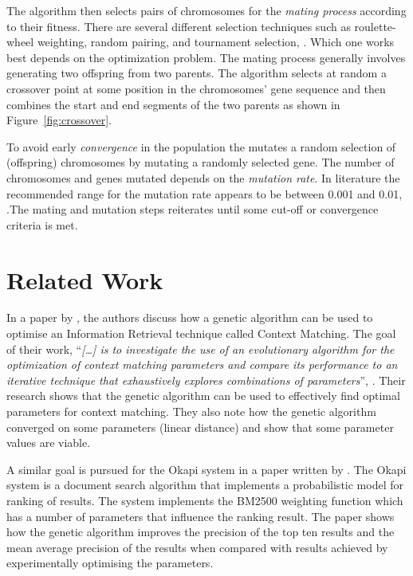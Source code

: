 The algorithm then selects pairs of chromosomes for the \textit{mating process} according to their fitness. There are several different selection techniques such as roulette-wheel weighting, random pairing, and tournament selection, \parencite{Haupt2004a}. Which one works best depends on the optimization problem. The mating process generally involves generating two offspring from two parents. The algorithm selects at random a crossover point at some position in the chromosomes' gene sequence and then combines the start and end segments of the two parents as shown in Figure~\ref{fig:crossover}.

To avoid early \textit{convergence} in the population the \GA mutates a random selection of (offspring) chromosomes by mutating a randomly selected gene. The number of chromosomes and genes mutated depends on the \textit{mutation rate}. In literature the recommended range for the mutation rate appears to be between 0.001 and 0.01, \parencite{Goldberg1989,Negnevitsky2002}.The mating and mutation steps reiterates until some cut-off or convergence criteria is met.

\section{Related Work}
\label{RelatedWork}
In  a paper by \cite{Zakos2005}, the authors discuss how a genetic algorithm can be used to optimise an Information Retrieval technique called Context Matching. The goal of their work, ``\textit{[\dots] is to investigate the use of an evolutionary algorithm for the optimization of context matching parameters and compare its performance to an iterative technique that exhaustively explores combinations of parameters}'', \parencite[][582]{Zakos2005}. Their research shows that the genetic algorithm can be used to effectively find optimal parameters for context matching. They also note how the genetic algorithm converged on some parameters (linear distance) and show that some parameter values are viable.

A similar goal is pursued for the Okapi system in a paper written by \cite{Chuan2003}. The Okapi system is a document search algorithm that implements a probabilistic model for ranking of results. The system implements the BM2500 weighting function which has a number of parameters that influence the ranking result. The paper shows how the genetic algorithm improves the precision of the top ten results and the mean average precision of the results when compared with results achieved by experimentally optimising the parameters.

